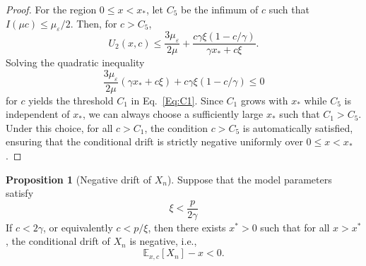 \documentclass[11pt]{article}
\theoremstyle{definition}
\newtheorem{proposition}[theorem]{Proposition}
\begin{document}
\begin{proof}
	For the region $0 \le x < x_*$, 
	let $C_5$ be the infimum of $c$ such that $I(\mu c) \le \mu_{\varepsilon}/2$. Then, for $c > C_5$,
	\[
	U_2(x,c) \le \frac{3\mu_{\varepsilon}}{2\mu} + \frac{c\gamma\xi(1 - c/\gamma)}{\gamma x_* + c \xi}.
	\]
	Solving the quadratic inequality 
	$$\frac{3\mu_{\varepsilon}}{2\mu} (\gamma x_* + c \xi) + c \gamma \xi (1 - c/\gamma) \leq 0$$ for $c$ yields the threshold $C_1$ in Eq.~\eqref{Eq:C1}. 
	Since $C_1$ grows with $x_*$ while $C_5$ is independent of $x_*$, we can always choose a sufficiently large $x_*$ such that $C_1 > C_5$. 
	Under this choice, for all $c > C_1$, the condition $c > C_5$ is automatically satisfied, ensuring that the conditional drift is strictly negative uniformly over $0 \le x < x_*$.
\end{proof}



\begin{proposition}[Negative drift of $X_n$]\label{Pro:ndX}
	Suppose that the model parameters satisfy 
	\begin{equation}
		\xi < \frac{p}{2 \gamma} \label{Eq:condition1}
	\end{equation}
	If $ c < 2 \gamma$, or equivalently $ c < p/\xi$,
	then there exists $x^* > 0$ such that for all $x > x^*$, the conditional drift of $X_n$ is negative, i.e.,
	$$\mathbb{E}_{x, c}[X_n] - x < 0.$$
\end{proposition}
\end{document}
